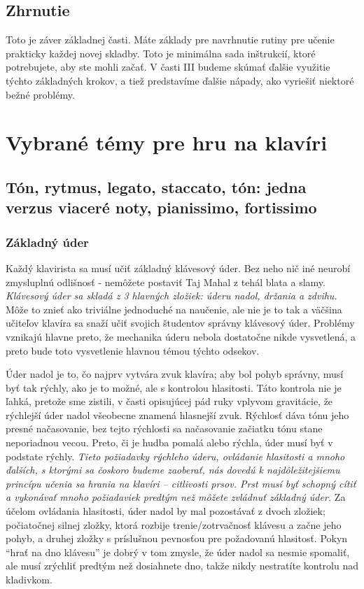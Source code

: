 \subsection{Zhrnutie}
Toto je záver základnej časti. Máte základy pre navrhnutie rutiny pre učenie prakticky každej novej skladby. Toto je minimálna sada inštrukcií, ktoré potrebujete, aby ste mohli začať. V časti III budeme skúmať ďalšie využitie týchto základných krokov, a tiež predstavíme ďalšie nápady, ako vyriešiť niektoré bežné problémy.

\section{Vybrané témy pre hru na klavíri}
\subsection{Tón, rytmus, legato, staccato, tón: jedna verzus viaceré noty, pianissimo, fortissimo}
\subsubsection{Základný úder}
Každý klavirista sa musí učiť základný klávesový úder. Bez neho nič iné neurobí zmysluplnú odlišnosť - nemôžete postaviť Taj Mahal z tehál blata a slamy. \emph{Klávesový úder sa skladá z 3 hlavných zložiek: úderu nadol, držania a zdvihu.} Môže to znieť ako triviálne jednoduché na naučenie, ale nie je to tak a väčšina učiteľov klavíra sa snaží učiť svojich študentov správny klávesový úder. Problémy vznikajú hlavne preto, že mechanika úderu nebola dostatočne nikde vysvetlená, a preto bude toto vysvetlenie hlavnou témou týchto odsekov.

Úder nadol je to, čo najprv vytvára zvuk klavíra; aby bol pohyb správny, musí byť tak rýchly, ako je to možné, ale s kontrolou hlasitosti. Táto kontrola nie je ľahká, pretože sme zistili, v časti opisujúcej pád ruky vplyvom gravitácie, že rýchlejší úder nadol všeobecne znamená hlasnejší zvuk. Rýchlosť dáva tónu jeho presné načasovanie, bez tejto rýchlosti sa načasovanie začiatku tónu stane neporiadnou vecou. Preto, či je hudba pomalá alebo rýchla, úder musí byť v podstate rýchly. \emph{Tieto požiadavky rýchleho úderu, ovládanie hlasitosti a mnoho ďalších, s ktorými sa čoskoro budeme zaoberať, nás dovedú k najdôležitejšiemu princípu učenia sa hrania na klavíri – citlivosti prsov. Prst musí byť schopný cítiť a vykonávať mnoho požiadaviek predtým než môžete zvládnuť základný úder.} Za účelom ovládania hlasitosti, úder nadol by mal pozostávať z dvoch zložiek; počiatočnej silnej zložky, ktorá rozbije trenie/zotrvačnosť klávesu a začne jeho pohyb, a druhej zložky s príslušnou pevnosťou pre požadovanú hlasitosť. Pokyn “hrať na dno klávesu” je dobrý v tom zmysle, že úder nadol sa nesmie spomaliť, ale musí zrýchliť predtým než dosiahnete dno, takže nikdy nestratíte kontrolu nad kladivkom.

